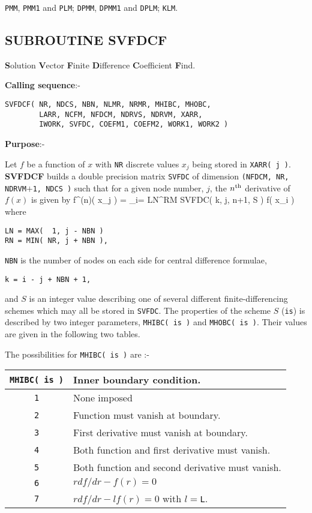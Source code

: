 \verb+PMM+, \verb+PMM1+ and \verb+PLM+;
\verb+DPMM+, \verb+DPMM1+ and \verb+DPLM+;
\verb+KLM+.

\subsection{SUBROUTINE SVFDCF}
\label{sec:svfdcfinfo}

{\bf S}olution
{\bf V}ector
{\bf F}inite
{\bf D}ifference
{\bf C}oefficient
{\bf F}ind. \newline

{\bf Calling sequence}:-
\begin{verbatim}
SVFDCF( NR, NDCS, NBN, NLMR, NRMR, MHIBC, MHOBC,
        LARR, NCFM, NFDCM, NDRVS, NDRVM, XARR,
        IWORK, SVFDC, COEFM1, COEFM2, WORK1, WORK2 )
\end{verbatim}

{\bf Purpose}:- \newline

Let $f$ be a function of $x$ with \verb+NR+ discrete
values $x_j$ being stored in \verb+XARR( j )+.
{\bf SVFDCF} builds a double precision matrix
\verb+SVFDC+ of dimension \newline
\verb+(NFDCM, NR, NDRVM+$+$\verb+1, NDCS )+
such that for a given node number, $j$, the $n^{\rm th}$
derivative of $f(x)$ is given by
\bed
f^{(n)}( x_j ) = \sum_{i= {\rm LN}}^{\rm RM}
{\rm SVFDC}( k, j, n+1, S ) f( x_i )
\eed
where
\begin{verbatim}
LN = MAX(  1, j - NBN )
RN = MIN( NR, j + NBN ),
\end{verbatim}
\verb+NBN+ is the number of nodes on each side
for central difference formulae,
\begin{verbatim}
k = i - j + NBN + 1,
\end{verbatim}
and $S$ is an integer value describing one of several
different finite-differencing schemes which may
all be stored in \verb+SVFDC+.
The properties of the scheme $S$ (\verb+is+) is described by two
integer parameters, \verb+MHIBC( is )+ and \verb+MHOBC( is )+.
Their values are given in the following two tables.

The possibilities for \verb+MHIBC( is )+ are :- \newline

\begin{tabular}{|c|l|}
\hline
\verb+MHIBC( is )+ & Inner boundary condition. \\
\hline
\hline
\verb+1+ & None imposed \\
\hline
\verb+2+ & Function must vanish at boundary. \\
\hline
\verb+3+ & First derivative must vanish at boundary. \\
\hline
\verb+4+ & Both function and first derivative must vanish. \\
\hline
\verb+5+ & Both function and second derivative must vanish. \\
\hline
\verb+6+ & $rdf/dr - f(r) = 0$ \\
\hline
\verb+7+ & $r df/dr - l f(r) = 0$ with $l=$\verb+L+. \\
\hline
\end{tabular} \newline

